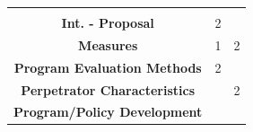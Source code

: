\documentclass[]{tufte-handout}
\begin{document}
\begin{longtable}[]{@{}cll@{}}
\begin{minipage}[t]{0.22\columnwidth}
\end{minipage} & \begin{minipage}[t]{0.22\columnwidth}\raggedright\strut
\strut
\end{minipage}\tabularnewline
\begin{minipage}[t]{0.47\columnwidth}\centering\strut
\textbf{Int. - Proposal}\strut
\end{minipage} & \begin{minipage}[t]{0.22\columnwidth}\raggedright\strut
2\strut
\end{minipage} & \begin{minipage}[t]{0.22\columnwidth}\raggedright\strut
\strut
\end{minipage}\tabularnewline
\begin{minipage}[t]{0.47\columnwidth}\centering\strut
\textbf{Measures}\strut
\end{minipage} & \begin{minipage}[t]{0.22\columnwidth}\raggedright\strut
1\strut
\end{minipage} & \begin{minipage}[t]{0.22\columnwidth}\raggedright\strut
2\strut
\end{minipage}\tabularnewline
\begin{minipage}[t]{0.47\columnwidth}\centering\strut
\textbf{Program Evaluation Methods}\strut
\end{minipage} & \begin{minipage}[t]{0.22\columnwidth}\raggedright\strut
2\strut
\end{minipage} & \begin{minipage}[t]{0.22\columnwidth}\raggedright\strut
\strut
\end{minipage}\tabularnewline
\begin{minipage}[t]{0.47\columnwidth}\centering\strut
\textbf{Perpetrator Characteristics}\strut
\end{minipage} & \begin{minipage}[t]{0.22\columnwidth}\raggedright\strut
\strut
\end{minipage} & \begin{minipage}[t]{0.22\columnwidth}\raggedright\strut
2\strut
\end{minipage}\tabularnewline
\begin{minipage}[t]{0.47\columnwidth}\centering\strut
\textbf{Program/Policy Development}\strut
\end{minipage} & \begin{minipage}[t]{0.22\columnwidth}\raggedright\strut

\end{minipage}
\end{longtable}
\end{document}
